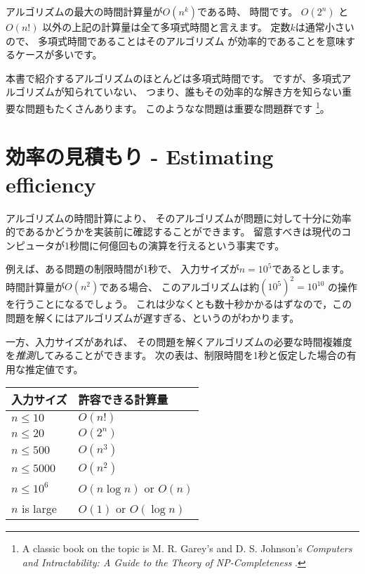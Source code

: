 アルゴリズムの最大の時間計算量が$O(n^k)$である時、
 時間です。
$O(2^n)$ と $O(n!)$ 以外の上記の計算量は全て多項式時間と言えます。
定数$k$は通常小さいので、
多項式時間であることはそのアルゴリズム が効率的であることを意味するケースが多いです。


本書で紹介するアルゴリズムのほとんどは多項式時間です。
ですが、多項式アルゴリズムが知られていない、
つまり、誰もその効率的な解き方を知らない重要な問題もたくさんあります。
このようなな問題は重要な問題群です
\footnote{A classic book on the topic is
M. R. Garey's and D. S. Johnson's
\emph{Computers and Intractability: A Guide to the Theory
of NP-Completeness} \cite{gar79}.}。

\section{効率の見積もり - Estimating efficiency}

アルゴリズムの時間計算により、
そのアルゴリズムが問題に対して十分に効率的であるかどうかを実装前に確認することができます。
留意すべきは現代のコンピュータが1秒間に何億回もの演算を行えるという事実です。

例えば、ある問題の制限時間が1秒で、
入力サイズが$n=10^5$であるとします。
時間計算量が$O(n^2)$である場合、
このアルゴリズムは約$(10^5)^2=10^{10}$ の操作を行うことになるでしょう。
これは少なくとも数十秒かかるはずなので，この問題を解くにはアルゴリズムが遅すぎる、というのがわかります。

一方、入力サイズがあれば、
その問題を解くアルゴリズムの必要な時間複雑度を\emph{推測}してみることができます。
次の表は、制限時間を1秒と仮定した場合の有用な推定値です。

\begin{center}
\begin{tabular}{ll}
入力サイズ & 許容できる計算量 \\
\hline
$n \le 10$ & $O(n!)$ \\
$n \le 20$ & $O(2^n)$ \\
$n \le 500$ & $O(n^3)$ \\
$n \le 5000$ & $O(n^2)$ \\
$n \le 10^6$ & $O(n \log n)$ or $O(n)$ \\
$n$ is large & $O(1)$ or $O(\log n)$ \\
\end{tabular}
\end{center}


